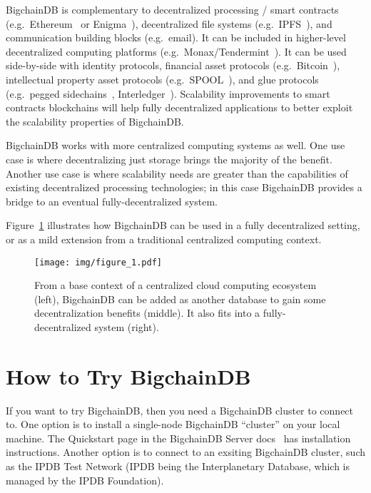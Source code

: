 \documentclass[a4paper]{article}
\begin{document}
BigchainDB is complementary to decentralized processing / smart contracts (e.g.~Ethereum~\cite{ethereum,buterin-ethereum} or Enigma~\cite{enigma,zyskind2015enigma}), decentralized file systems (e.g.~IPFS~\cite{ipfs}), and communication building blocks (e.g.~email).
It can be included in higher-level decentralized computing platforms (e.g.~Monax/Tendermint~\cite{monax,tendermint}).
It can be used side-by-side with identity protocols, financial asset protocols (e.g.~Bitcoin~\cite{nakamoto2009bitcoin}), intellectual property asset protocols (e.g.~SPOOL~\cite{dejonghe_spool}), and glue protocols (e.g.~pegged sidechains~\cite{back2010sidechains}, Interledger~\cite{thomas2015interledger}).
Scalability improvements to smart contracts blockchains will help fully decentralized applications to better exploit the scalability properties of BigchainDB.

BigchainDB works with more centralized computing systems as well.
One use case is where decentralizing just storage brings the majority of the benefit.
Another use case is where scalability needs are greater than the capabilities of existing decentralized processing technologies; in this case BigchainDB provides a bridge to an eventual fully-decentralized system.

Figure~\ref{fig:bigchain_ecosystem} illustrates how BigchainDB can be used in a fully decentralized setting, or as a mild extension from a traditional centralized computing context.


\begin{figure}[!ht]
  \centering
  \texttt{[image: img/figure\_1.pdf]}
  \caption{From a base context of a centralized cloud computing ecosystem (left), BigchainDB can be added as another database to gain some decentralization benefits (middle).
  It also fits into a fully-decentralized system (right).}
  \label{fig:bigchain_ecosystem}
\end{figure}


\section{How to Try BigchainDB}

If you want to try BigchainDB,
then you need a BigchainDB cluster to connect to.
One option is to install a single-node BigchainDB ``cluster''
on your local machine.
The Quickstart page
in the BigchainDB Server docs~\cite{bigchaindb_server_quickstart}
has installation instructions.
Another option is to connect to an exsiting
BigchainDB cluster, such as the IPDB Test Network
(IPDB being the Interplanetary Database,
which is managed by the IPDB Foundation\cite{ipdb_foundation_website}).
\end{document}
